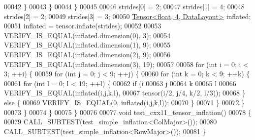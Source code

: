 \begin{DoxyCode}
00042       \}
00043     \}
00044   \}
00045 
00046   strides[0] = 2;
00047   strides[1] = 4;
00048   strides[2] = 2;
00049   strides[3] = 3;
00050   \hyperlink{class_eigen_1_1_tensor}{Tensor<float, 4, DataLayout>} inflated;
00051   inflated = tensor.inflate(strides);
00052 
00053   VERIFY\_IS\_EQUAL(inflated.dimension(0), 3);
00054   VERIFY\_IS\_EQUAL(inflated.dimension(1), 9);
00055   VERIFY\_IS\_EQUAL(inflated.dimension(2), 9);
00056   VERIFY\_IS\_EQUAL(inflated.dimension(3), 19);
00057 
00058   \textcolor{keywordflow}{for} (\textcolor{keywordtype}{int} i = 0; i < 3; ++i) \{
00059     \textcolor{keywordflow}{for} (\textcolor{keywordtype}{int} j = 0; j < 9; ++j) \{
00060       \textcolor{keywordflow}{for} (\textcolor{keywordtype}{int} k = 0; k < 9; ++k) \{
00061         \textcolor{keywordflow}{for} (\textcolor{keywordtype}{int} l = 0; l < 19; ++l) \{
00062           \textcolor{keywordflow}{if} (i %
00063               j %
00064               k %
00065               l %
00066             VERIFY\_IS\_EQUAL(inflated(i,j,k,l),
00067                             tensor(i/2, j/4, k/2, l/3));
00068           \} \textcolor{keywordflow}{else} \{
00069             VERIFY\_IS\_EQUAL(0, inflated(i,j,k,l));
00070           \}
00071         \}
00072       \}
00073     \}
00074   \}
00075 \}
00076 
00077 \textcolor{keywordtype}{void} test\_cxx11\_tensor\_inflation()
00078 \{
00079   CALL\_SUBTEST(test\_simple\_inflation<ColMajor>());
00080   CALL\_SUBTEST(test\_simple\_inflation<RowMajor>());
00081 \}
\end{DoxyCode}
